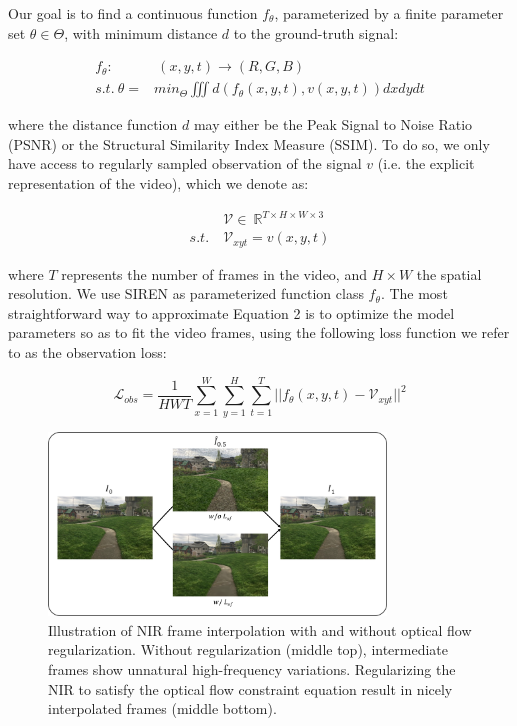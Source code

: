 \documentclass{article}
\begin{document}
Our goal is to find a continuous function $f_{\theta}$, parameterized by a finite parameter set $\theta \in \Theta$,
with minimum distance $d$ to the ground-truth signal:

\begin{equation}
\begin{aligned}
f_{\theta}:& \:(x, y, t) \rightarrow (R, G, B) \\
s.t. \: \theta =& min_{\Theta} \iiint d(f_{\theta}(x,y,t), v(x,y,t)) dx dy dt
\end{aligned}
\end{equation}

where the distance function $d$ may either be the Peak Signal to Noise Ratio (PSNR) or the Structural Similarity Index Measure (SSIM).
To do so, we only have access to regularly sampled observation of the signal $v$
(i.e. the explicit representation of the video), which we denote as:

\begin{equation}
\begin{aligned}
&\mathcal{V} \in  \: \mathbb{R}^{T \times H \times W \times 3} \\
s.t. \: &\mathcal{V}_{xyt} =   v(x, y, t) %
\end{aligned}
\end{equation}

where $T$ represents the number of frames in the video, and $H \times W$ the spatial resolution.
We use SIREN as parameterized function class $f_{\theta}$.
The most straightforward way to approximate Equation 2 is to optimize the model parameters so as to fit the video frames,
using the following loss function we refer to as the observation loss:

\begin{equation}
\mathcal{L}_{obs} = \frac{1}{HWT} \sum_{x=1}^W\sum_{y=1}^H\sum_{t=1}^T || f_{\theta}(x,y,t) - \mathcal{V}_{xyt} ||^2
\end{equation}

\begin{figure}[t]
\centering
\includegraphics[width=0.8\textwidth]{"w_wo_OF"}
\caption{Illustration of NIR frame interpolation with and without optical flow regularization.
Without regularization (middle top), intermediate frames show unnatural high-frequency variations.
Regularizing the NIR to satisfy the optical flow constraint equation result in nicely interpolated frames (middle bottom).
}
\end{figure}
\end{document}
